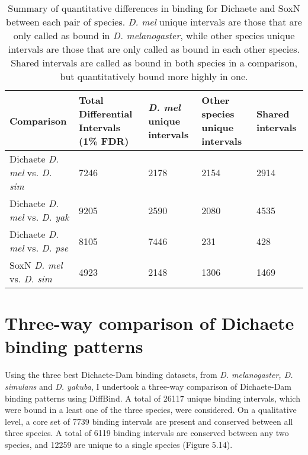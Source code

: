 \begin{table}[h]
\centering
\begin{tabular}{|p{3cm}|p{2.5cm}|p{2.5cm}|p{2.5cm}|p{2.5cm}|}
\hline
\textbf{Comparison}                 & \textbf{Total Differential Intervals (1\% FDR)} & \textbf{\emph{D. mel} unique intervals} & \textbf{Other species unique intervals} & \textbf{Shared intervals} \\ \hline
Dichaete \emph{D. mel} vs. \emph{D. sim} & 7246                                   & 2178                    & 2154                           & 2914             \\ \hline
Dichaete \emph{D. mel} vs. \emph{D. yak} & 9205                                   & 2590                    & 2080                           & 4535             \\ \hline
Dichaete \emph{D. mel} vs. \emph{D. pse} & 8105                                   & 7446                    & 231                            & 428              \\ \hline
SoxN \emph{D. mel} vs. \emph{D. sim}     & 4923                                   & 2148                    & 1306                           & 1469             \\ \hline
\end{tabular}
\caption{Summary of quantitative differences in binding for Dichaete and SoxN between each pair of species. \emph{D. mel} unique intervals are those that are only called as bound in \emph{D. melanogaster}, while other species unique intervals are those that are only called as bound in each other species. Shared intervals are called as bound in both species in a comparison, but quantitatively bound more highly in one.}
\label{Table 5.1}
\end{table}

\section{Three-way comparison of Dichaete binding patterns}
Using the three best Dichaete-Dam binding datasets, from \emph{D. melanogaster, D. simulans} and \emph{D. yakuba}, I undertook a three-way comparison of Dichaete-Dam binding patterns using DiffBind. A total of 26117 unique binding intervals, which were bound in a least one of the three species, were considered. On a qualitative level, a core set of 7739 binding intervals are present and conserved between all three species. A total of 6119 binding intervals are conserved between any two species, and 12259 are unique to a single species (Figure 5.14).

